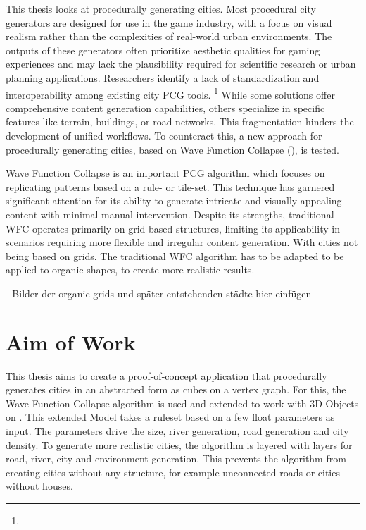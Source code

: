 This thesis looks at procedurally generating cities. Most procedural city generators are designed for use in the game industry, with a focus on visual realism rather than the complexities of real-world urban environments. The outputs of these generators often prioritize aesthetic qualities for gaming experiences and may lack the plausibility required for scientific research or urban planning applications. Researchers identify a lack of standardization and interoperability among existing city PCG tools. \footnote{} While some solutions offer comprehensive content generation capabilities, others specialize in specific features like terrain, buildings, or road networks. This fragmentation hinders the development of unified workflows. To counteract this, a new approach for procedurally generating cities, based on Wave Function Collapse (), is tested. 

Wave Function Collapse is an important PCG algorithm which focuses on replicating patterns based on a rule- or tile-set. This technique has garnered significant attention for its ability to generate intricate and visually appealing content with minimal manual intervention. Despite its strengths, traditional WFC operates primarily on grid-based structures, limiting its applicability in scenarios requiring more flexible and irregular content generation. With cities not being based on grids. The traditional WFC algorithm has to be adapted to be applied to organic shapes, to create more realistic results.

- Bilder der organic grids und später entstehenden städte hier einfügen

\section{Aim of Work}
\label{sec:AimOfWork}

This thesis aims to create a proof-of-concept application that procedurally generates cities in an abstracted form as cubes on a vertex graph. For this, the Wave Function Collapse algorithm is used and extended to work with 3D Objects on . This extended Model takes a ruleset based on a few float parameters as input. The parameters drive the size, river generation, road generation and city density. To generate more realistic cities, the algorithm is layered with layers for road, river, city and environment generation. This prevents the algorithm from creating cities without any structure, for example unconnected roads or cities without houses. 

